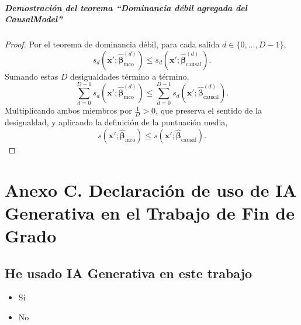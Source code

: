 \documentclass[12pt]{report} %
\begin{document}
\paragraph*{Demostración del teorema ``Dominancia débil agregada del CausalModel''}
\begin{proof}
    Por el teorema de dominancia débil, para cada salida $d \in \{0, \ldots, D-1\}$,
    $$s_d\!\left(\mathbf{x}'; \widehat{\boldsymbol{\beta}}^{(d)}_{\text{mco}}\right) \leq s_d\!\left(\mathbf{x}'; \widehat{\boldsymbol{\beta}}^{(d)}_{\text{causal}}\right).$$
    Sumando estas $D$ desigualdades término a término,
    $$\sum_{d=0}^{D-1} s_d\!\left(\mathbf{x}'; \widehat{\boldsymbol{\beta}}^{(d)}_{\text{mco}}\right) \leq \sum_{d=0}^{D-1} s_d\!\left(\mathbf{x}'; \widehat{\boldsymbol{\beta}}^{(d)}_{\text{causal}}\right).$$
    Multiplicando ambos miembros por $\tfrac{1}{D} > 0$, que preserva el sentido de la desigualdad, y aplicando la definición de la puntuación media,
    $$s\!\left(\mathbf{x}'; \widehat{\boldsymbol{\beta}}_{\text{mco}}\right) \leq s\!\left(\mathbf{x}'; \widehat{\boldsymbol{\beta}}_{\text{causal}}\right).$$
\end{proof}


\chapter* {Anexo C. Declaración de uso de IA Generativa en el Trabajo de Fin de Grado}

\section*{He usado IA Generativa en este trabajo}
\begin{itemize}
    \item[\ding{51}] Sí
    \item[\ding{113}] No
\end{itemize}
\end{document}
